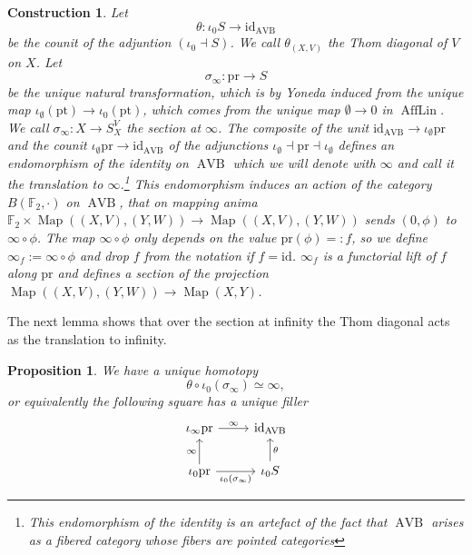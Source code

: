 \documentclass{article}
\newcommand{\F}{\mathbb{F}}
\newcommand{\pt}{\mathrm{pt}}
\newcommand{\pr}{\mathrm{pr}}
\newcommand{\id}{\mathrm{id}}
\DeclareMathOperator{\AVB}{AVB}
\DeclareMathOperator{\AffLin}{AffLin}
\DeclareMathOperator{\Map}{Map}
\newtheorem{proposition}{Proposition}
\newtheorem{construction}{Construction}
\begin{document}
\begin{construction}
    Let 
    \[
      \theta \colon \iota_0 S \to \id_{\AVB}  
    \]
    be the counit of the adjuntion $(\iota_0 \dashv S)$.
    We call $\theta_{(X,V)}$ the \emph{Thom diagonal of $V$ on $X$}.
    Let 
    \[ 
        \sigma_\infty \colon \pr \to S    
    \]
    be the unique natural transformation, which is by Yoneda induced from the unique map $\iota_\emptyset(\pt) \to \iota_0(\pt)$, 
    which comes from the unique map $\emptyset \to 0$ in $\AffLin$.
    We call $\sigma_\infty \colon X \to S^V_X$ \emph{the section at $\infty$}.
    The composite of the unit $\id_{\AVB} \to \iota_\emptyset \pr$ and the counit $\iota_\emptyset \pr \to \id_{\AVB}$
    of the adjunctions $\iota_\emptyset \dashv \pr \dashv \iota_\emptyset$ defines an endomorphism
    of the identity on $\AVB$ which we will denote with $\infty$
    and call it the \emph{translation to $\infty$}.\footnote{This endomorphism of the identity is an artefact of the fact that $\AVB$ arises as a fibered category whose fibers are pointed categories}
    This endomorphism induces an action of the category $B(\F_2,\cdot)$ on $\AVB$, that on mapping anima 
    $\F_2 \times \Map((X,V),(Y,W)) \to \Map((X,V),(Y,W))$ sends $(0, \phi)$ to $\infty \circ \phi$.
    The map $\infty \circ \phi$ only depends on the value $\pr(\phi) =: f$, so we define 
    $\infty_{f} := \infty \circ \phi$ and drop $f$ from the notation if $f = \id$. $\infty_f$ is a functorial lift of $f$ along $\pr$ and defines a section 
    of the projection $\Map((X,V),(Y,W)) \to \Map(X,Y)$.
    \label{constr:thomdiag1}
\end{construction}

    The next lemma shows that over the section at infinity the Thom diagonal acts as the translation to infinity.
\begin{proposition}
    We have a unique homotopy
    \[
      \theta \circ \iota_0(\sigma_\infty) \simeq \infty , 
    \]
    or equivalently the following square has a unique filler 
    \[\begin{tikzcd}
        {\iota_\infty \pr} & {\id_{\AVB}} \\
        {\iota_0 \pr} & {\iota_0S}
        \arrow["{\iota_0(\sigma_\infty)}"', from=2-1, to=2-2]
        \arrow["\theta"', from=2-2, to=1-2]
        \arrow["\infty", from=2-1, to=1-1]
        \arrow["\infty", from=1-1, to=1-2]
    \end{tikzcd}\label{diag:AVBsquare}\]\label{prop: thomatinfty}
\end{proposition}
\end{document}
